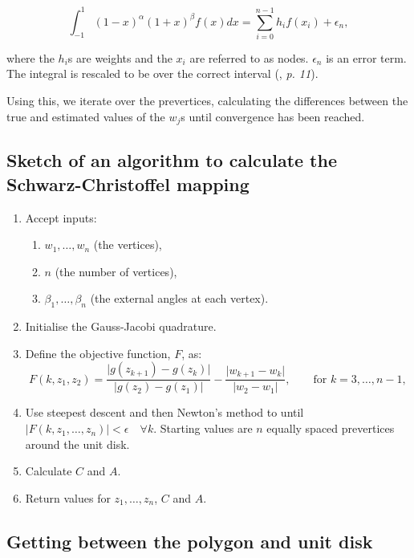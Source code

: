 \documentclass[a4paper,10pt]{amsart}
\newcommand{\sch}{Schwarz-Christoffel }
\begin{document}
\begin{equation}
\int_{-1}^{1} (1-x)^\alpha (1+x)^\beta f(x) dx = \sum_{i=0}^{n-1}h_if(x_i) + \epsilon_n,
\end{equation}

where the $h_i$s are weights and the $x_i$ are referred to as nodes. $\epsilon_n$ is an error term. The integral is rescaled to be over the correct interval (\cite{trefethen}, \emph{p. 11}).

Using this, we iterate over the prevertices, calculating the differences between the true and estimated values of the $w_j$s until convergence has been reached.


\subsection{Sketch of an algorithm to calculate the \sch mapping}

\begin{enumerate}
\item Accept inputs:
   \begin{enumerate} 
      \item $w_1,\dots,w_n$ (the vertices),
      \item $n$ (the number of vertices),
      \item $\beta_1,\dots,\beta_n$ (the external angles at each vertex).
   \end{enumerate}
\item Initialise the Gauss-Jacobi quadrature.
\item Define the objective function, $F$, as:
 \begin{equation*}
 F(k,z_1,z_2) = \frac{\vert g(z_{k+1}) -  g(z_k) \vert}{\vert g(z_2)-g(z_1)\vert} - \frac{\vert w_{k+1} - w_k\vert}{\vert w_2 - w_1\vert}, \qquad \text{for } k=3,\dots,n-1,
 \end{equation*}
\item Use steepest descent and then Newton's method to until $\vert F(k,z_1,\dots,z_n)\vert < \epsilon \quad \forall k$. Starting values are $n$ equally spaced prevertices around the unit disk.
\item Calculate $C$ and $A$.
\item Return values for $z_1,\dots,z_n$, $C$ and $A$.
\end{enumerate}



\subsection{Getting between the polygon and unit disk}
\end{document}
